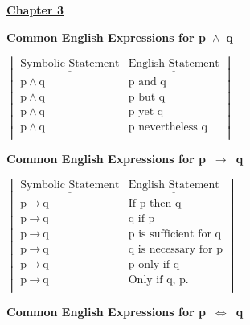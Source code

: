 \documentclass{article}
\begin{document}
\begin{large}
\underline{\textbf{\huge Chapter 3 \phantom{ } \phantom{ } \phantom{ } \phantom{ }}}

\textbf{Common English Expressions for p\ $\wedge$\ q}

$ \begin{vmatrix}

\underline{\text{Symbolic Statement}} & \underline{\text{English Statement}} \\

\text{p}\ \wedge\ \text{q} & \text{p and q} \\

\text{p}\ \wedge\ \text{q} & \text{p but q} \\

\text{p}\ \wedge\ \text{q} & \text{p yet q} \\

\text{p}\ \wedge\ \text{q} & \text{p nevertheless q} \\

\end{vmatrix} $

\vspace{0.2in}

\textbf{Common English Expressions for p\ $\rightarrow$\ q}

$ \begin{vmatrix}

\underline{\text{Symbolic Statement}} & \underline{\text{English Statement}} \\

\text{p}\ \rightarrow\ \text{q} & \text{If p then q} \\

\text{p}\ \rightarrow\ \text{q} & \text{q if p} \\

\text{p}\ \rightarrow\ \text{q} & \text{p is sufficient for q} \\

\text{p}\ \rightarrow\ \text{q} & \text{q is necessary for p} \\

\text{p}\ \rightarrow\ \text{q} & \text{p only if q} \\

\text{p}\ \rightarrow\ \text{q} & \text{Only if q, p.} \\

\end{vmatrix} $

\vspace{1.5in}

\textbf{Common English Expressions for p\ $\Leftrightarrow$\ q}


\end{large}
\end{document}
